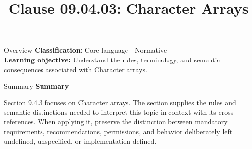 \documentclass[10pt,letterpaper]{article}
\title{Clause 09.04.03: Character Arrays}
\author{}
\date{}
\begin{document}
\maketitle
\begin{CornellOverviewBox}{Overview}
\textbf{Classification:} Core language - Normative\\[2pt]
\textbf{Learning objective:} Understand the rules, terminology, and semantic consequences associated with Character arrays.
\end{CornellOverviewBox}\begin{CornellSummaryBox}{Summary}
{\sffamily\bfseries\color{Accent} Summary}\par\vspace{3pt}Section 9.4.3 focuses on Character arrays. The section supplies the rules and semantic distinctions needed to interpret this topic in context with its cross-references. When applying it, preserve the distinction between mandatory requirements, recommendations, permissions, and behavior deliberately left undefined, unspecified, or implementation-defined.
\end{CornellSummaryBox}
\end{document}
